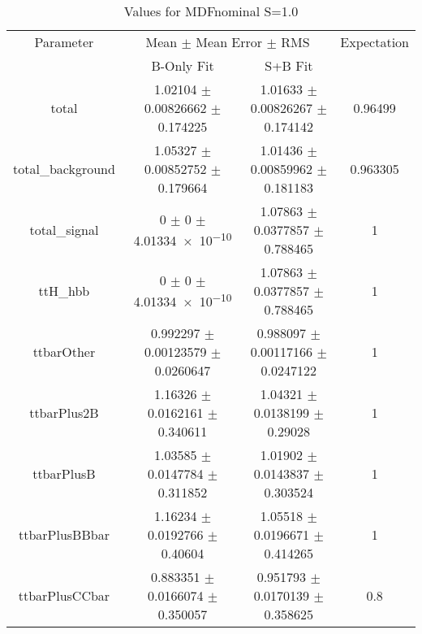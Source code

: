 \begin{table}
\centering
\caption{Values for MDFnominal S=1.0}
\begin{tabular}{cccc}
\toprule
Parameter & \multicolumn{2}{c}{Mean $\pm$ Mean Error $\pm$ RMS} & Expectation\\
 & B-Only Fit & S+B Fit & \\
\midrule
total & \num{1.02104} $\pm$ \num{0.00826662} $\pm$ \num{0.174225} & \num{1.01633} $\pm$ \num{0.00826267} $\pm$ \num{0.174142} & \num{0.96499}\\
total\_background & \num{1.05327} $\pm$ \num{0.00852752} $\pm$ \num{0.179664} & \num{1.01436} $\pm$ \num{0.00859962} $\pm$ \num{0.181183} & \num{0.963305}\\
total\_signal & \num{0} $\pm$ \num{0} $\pm$ \num{4.01334e-10} & \num{1.07863} $\pm$ \num{0.0377857} $\pm$ \num{0.788465} & \num{1}\\
ttH\_hbb & \num{0} $\pm$ \num{0} $\pm$ \num{4.01334e-10} & \num{1.07863} $\pm$ \num{0.0377857} $\pm$ \num{0.788465} & \num{1}\\
ttbarOther & \num{0.992297} $\pm$ \num{0.00123579} $\pm$ \num{0.0260647} & \num{0.988097} $\pm$ \num{0.00117166} $\pm$ \num{0.0247122} & \num{1}\\
ttbarPlus2B & \num{1.16326} $\pm$ \num{0.0162161} $\pm$ \num{0.340611} & \num{1.04321} $\pm$ \num{0.0138199} $\pm$ \num{0.29028} & \num{1}\\
ttbarPlusB & \num{1.03585} $\pm$ \num{0.0147784} $\pm$ \num{0.311852} & \num{1.01902} $\pm$ \num{0.0143837} $\pm$ \num{0.303524} & \num{1}\\
ttbarPlusBBbar & \num{1.16234} $\pm$ \num{0.0192766} $\pm$ \num{0.40604} & \num{1.05518} $\pm$ \num{0.0196671} $\pm$ \num{0.414265} & \num{1}\\
ttbarPlusCCbar & \num{0.883351} $\pm$ \num{0.0166074} $\pm$ \num{0.350057} & \num{0.951793} $\pm$ \num{0.0170139} $\pm$ \num{0.358625} & \num{0.8}\\
\bottomrule
\end{tabular}
\end{table}
